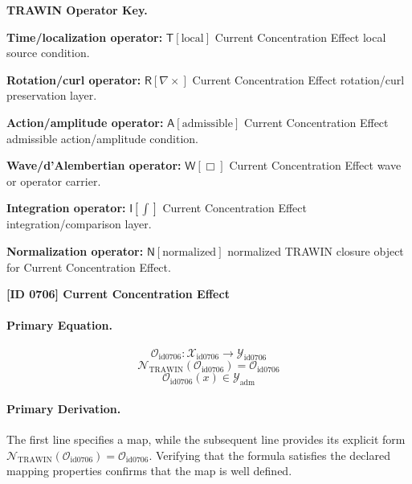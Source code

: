 \par\vspace{0.45\baselineskip}
\noindent\begin{minipage}[t]{\linewidth}
\begingroup
\small
\raggedright
\textbf{TRAWIN Operator Key.}\par
\noindent\textbf{Time/localization operator:} $\mathsf{T}\!\left[\mathrm{local}\right]$ Current Concentration Effect local source condition.\par
\noindent\textbf{Rotation/curl operator:} $\mathsf{R}\!\left[\nabla\times\right]$ Current Concentration Effect rotation/curl preservation layer.\par
\noindent\textbf{Action/amplitude operator:} $\mathsf{A}\!\left[\mathrm{admissible}\right]$ Current Concentration Effect admissible action/amplitude condition.\par
\noindent\textbf{Wave/d'Alembertian operator:} $\mathsf{W}\!\left[\Box\right]$ Current Concentration Effect wave or operator carrier.\par
\noindent\textbf{Integration operator:} $\mathsf{I}\!\left[\int\right]$ Current Concentration Effect integration/comparison layer.\par
\noindent\textbf{Normalization operator:} $\mathsf{N}\!\left[\mathrm{normalized}\right]$ normalized TRAWIN closure object for Current Concentration Effect.\par
\endgroup
\end{minipage}

\clearpage
\noindent\textbf{[ID 0706] Current Concentration Effect}\par
\vspace{0.35em}
\paragraph{Primary Equation.}
\[
\mathcal{O}_{\mathrm{id0706}}:\mathcal{X}_{\mathrm{id0706}}\longrightarrow\mathcal{Y}_{\mathrm{id0706}}
\]
\[
\mathcal{N}_{\mathrm{TRAWIN}}(\mathcal{O}_{\mathrm{id0706}})=\mathcal{O}_{\mathrm{id0706}}
\]
\[
\mathcal{O}_{\mathrm{id0706}}(x)\in\mathcal{Y}_{\mathrm{adm}}
\]

\paragraph{Primary Derivation.}
The first line specifies a map, while the subsequent line provides its explicit form \( \mathcal{N}_{\mathrm{TRAWIN}}(\mathcal{O}_{\mathrm{id0706}})=\mathcal{O}_{\mathrm{id0706}} \). Verifying that the formula satisfies the declared mapping properties confirms that the map is well defined.
